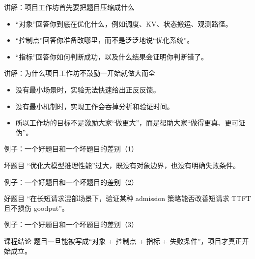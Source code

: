 \begin{frame}{讲解：项目工作坊首先要把题目压缩成什么}
  \begin{itemize}
    \item “对象”回答你到底在优化什么，例如调度、KV、状态搬运、观测路径。
    \item “控制点”回答你准备改哪里，而不是泛泛地说“优化系统”。
    \item “指标”回答你如何判断成功，以及什么结果会证明你判断错了。
  \end{itemize}
\end{frame}

\begin{frame}{讲解：为什么项目工作坊不鼓励一开始就做大而全}
  \begin{itemize}
    \item 没有最小场景时，实验无法快速给出正反反馈。
    \item 没有最小机制时，实现工作会吞掉分析和验证时间。
    \item 所以工作坊的目标不是激励大家“做更大”，而是帮助大家“做得更真、更可证伪”。
  \end{itemize}
\end{frame}

\begin{frame}{例子：一个好题目和一个坏题目的差别（1）}
\begin{block}{坏题目}
    “优化大模型推理性能”过大，既没有对象边界，也没有明确失败条件。
  \end{block}
\end{frame}

\begin{frame}{例子：一个好题目和一个坏题目的差别（2）}
\begin{block}{好题目}
    “在长短请求混部场景下，验证某种 admission 策略能否改善短请求 TTFT 且不损伤 goodput”。
  \end{block}
\end{frame}

\begin{frame}{例子：一个好题目和一个坏题目的差别（3）}
\begin{block}{课程结论}
    题目一旦能被写成“对象 + 控制点 + 指标 + 失败条件”，项目才真正开始成立。
  \end{block}
\end{frame}

